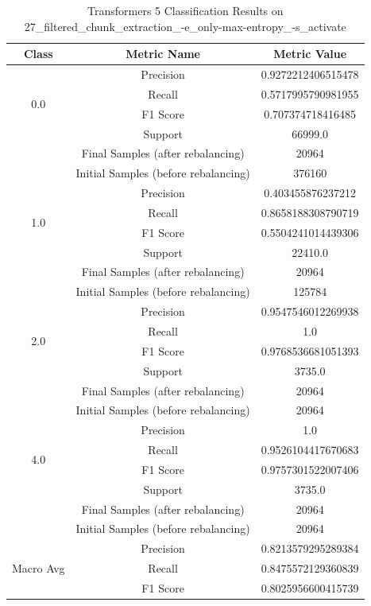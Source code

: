 \begin{longtable}{|c|c|c|}
\caption{Transformers 5 Classification Results on 27\_filtered\_chunk\_extraction\_-e\_only-max-entropy\_-s\_activate} \label{tab:27_filtered_chunk_extraction_-e_only-max-entropy_-s_activate_transformers_5_classifiers_results} \\
\hline
Class & Metric Name & Metric Value \\
\hline
\multirow{4}{*}{0.0} & Precision & 0.9272212406515478 \\
 & Recall & 0.5717995790981955 \\
 & F1 Score & 0.707374718416485 \\
 & Support & 66999.0 \\
 & Final Samples (after rebalancing) & 20964 \\
 & Initial Samples (before rebalancing) & 376160 \\
\hline
\multirow{4}{*}{1.0} & Precision & 0.403455876237212 \\
 & Recall & 0.8658188308790719 \\
 & F1 Score & 0.5504241014439306 \\
 & Support & 22410.0 \\
 & Final Samples (after rebalancing) & 20964 \\
 & Initial Samples (before rebalancing) & 125784 \\
\hline
\multirow{4}{*}{2.0} & Precision & 0.9547546012269938 \\
 & Recall & 1.0 \\
 & F1 Score & 0.9768536681051393 \\
 & Support & 3735.0 \\
 & Final Samples (after rebalancing) & 20964 \\
 & Initial Samples (before rebalancing) & 20964 \\
\hline
\multirow{4}{*}{4.0} & Precision & 1.0 \\
 & Recall & 0.9526104417670683 \\
 & F1 Score & 0.9757301522007406 \\
 & Support & 3735.0 \\
 & Final Samples (after rebalancing) & 20964 \\
 & Initial Samples (before rebalancing) & 20964 \\
\hline
\multirow{4}{*}{Macro Avg} & Precision & 0.8213579295289384 \\
 & Recall & 0.8475572129360839 \\
 & F1 Score & 0.8025956600415739 \\

\end{longtable}
